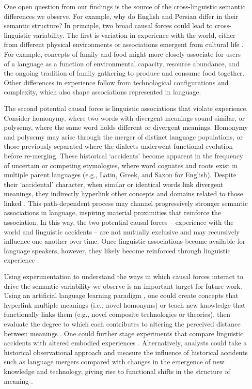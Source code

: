 \documentclass[9pt,twocolumn,twoside,lineno]{pnas-new}
\begin{document}
One open question from our findings is the source of the cross-linguistic semantic differences we observe. For example, why do English and Persian differ in their semantic structure? In principle, two broad causal forces could lead to cross-linguistic variability. The first is variation in experience with the world, either from different physical environments or associations emergent from cultural life \cite{dale2012understanding, lupyan2015role,lupyan2016there,lupyan2010language}. For example, concepts of family and food might more closely associate for users of a language as a function of environmental capacity, resource abundance, and the ongoing tradition of family gathering to produce and consume food together. Other differences in experience follow from technological configurations and complexity, which also shape associations represented in language.

The second potential causal force is linguistic associations that violate experience. Consider homonymy, where two words with divergent meanings sound similar, or polysemy, where the same word holds different or divergent meanings. Homonymy and polysemy may arise through the merger of distinct language populations, or those previously separated where the dialects underwent functional evolution before re-merging. These historical `accidents' become apparent in the frequency of uncertain or competing etymologies, where word cognates and roots exist in multiple parent languages (e.g., Latin, Greek, and Saxon for English). Despite their `accidental' character, when similar or identical words link divergent meanings, they indirectly hyperlink other concepts and domains related to those linked \cite{aceves2021human}. This path-dependent process may channel progressively stronger semantic associations in language, inspiring material proximities that reinforce the association. In this way, the two potential causal forces -- experience with the world and linguistic accidents -- are not mutually exclusive and may recursively influence one another over time. Once linguistic associations become available for language speakers, however, they likely become reinforced through linguistic experience \cite{greenwald2017ai,lewis2020,  lewis2016length}. 

Using experimentation to understand the ways in which causal forces interact to drive the semantic variability we observe is an important target for future work. Using an artificial language learning paradigm \cite{kirby2008cumulative}, one could create concepts that hyperlink multiple meanings (i.e., novel homonyms) or teach new knowledge that functionally links them (e.g., novel composite technologies or theories), then evaluate the degree to which each contributes to altering the perceived distance between meanings \cite{lupyan2007language}. One could further stage experiments that compare linguistic accidents with altered embodied experiences \cite{casasanto2011different}. Alternatively, analysts could take a historical observational approach and measure the influence of historical accidents such as language mergers compared with changes in the emergence of new knowledge and technology, giving rise to functional shifts in the structure of meaning \cite[e.g.][]{pagel2007frequency}. 
\end{document}
